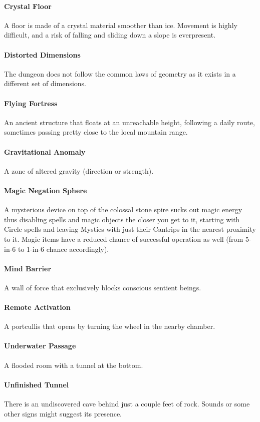 \documentclass[itdr]{subfiles}
\begin{document}
\vfill
\paragraph{Crystal Floor}
A floor is made of a crystal material smoother than ice. Movement is highly difficult, and a risk of falling and sliding down a slope is everpresent.

\vfill
\paragraph{Distorted Dimensions}
The dungeon does not follow the common laws of geometry as it exists in a different set of dimensions.

\vfill
\paragraph{Flying Fortress}
An ancient structure that floats at an unreachable height, following a daily route, sometimes passing pretty close to the local mountain range.

\vfill
\paragraph{Gravitational Anomaly}
A zone of altered gravity (direction or strength).

\vfill
\paragraph{Magic Negation Sphere}
A mysterious device on top of the colossal stone spire sucks out magic energy thus disabling spells and magic objects the closer you get to it, starting with  Circle spells and leaving Mystics with just their Cantrips in the nearest proximity to it. Magic items have a reduced chance of successful operation as well (from 5-in-6 to 1-in-6 chance accordingly).

\vfill
\paragraph{Mind Barrier}
A wall of force that exclusively blocks conscious sentient beings.

\vfill
\paragraph{Remote Activation}
A portcullis that opens by turning the wheel in the nearby chamber.

\vfill
\paragraph{Underwater Passage}
A flooded room with a tunnel at the bottom.

\vfill
\paragraph{Unfinished Tunnel}
There is an undiscovered cave behind just a couple feet of rock. Sounds or some other signs might suggest its presence.

\vfill
\end{document}
